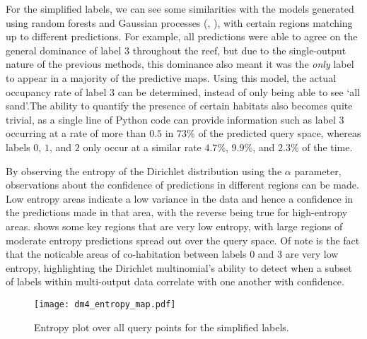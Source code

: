 For the simplified labels, we can see some similarities with the models generated using random forests and Gaussian processes (, ), with certain regions matching up to different predictions. For example, all predictions were able to agree on the general dominance of label 3 throughout the reef, but due to the single-output nature of the previous methods, this dominance also meant it was the \textit{only} label to appear in a majority of the predictive maps. Using this model, the actual occupancy rate of label 3 can be determined, instead of only being able to see `all sand'.The ability to quantify the presence of certain habitats also becomes quite trivial, as a single line of Python code can provide information such as label 3 occurring at a rate of more than $0.5$ in $73\%$ of the predicted query space, whereas labels $0$, $1$, and $2$ only occur at a similar rate $4.7\%$, $9.9\%$, and $2.3\%$ of the time.

By observing the entropy of the Dirichlet distribution using the $\alpha$ parameter, observations about the confidence of predictions in different regions can be made. Low entropy areas indicate a low variance in the data and hence a confidence in the predictions made in that area, with the reverse being true for high-entropy areas.  shows some key regions that are very low entropy, with large regions of moderate entropy predictions spread out over the query space. Of note is the fact that the noticable areas of co-habitation between labels $0$ and $3$ are very low entropy, highlighting the Dirichlet multinomial's ability to detect when a subset of labels within multi-output data correlate with one another with confidence.

\begin{figure}
    \begin{minipage}{\linewidth}
        \centerline{\texttt{[image: dm4\_entropy\_map.pdf]}}
        \caption{Entropy plot over all query points for the simplified labels. }
        \label{fig:dm4_entropy}
    \end{minipage}
    \hfill
\end{figure}

